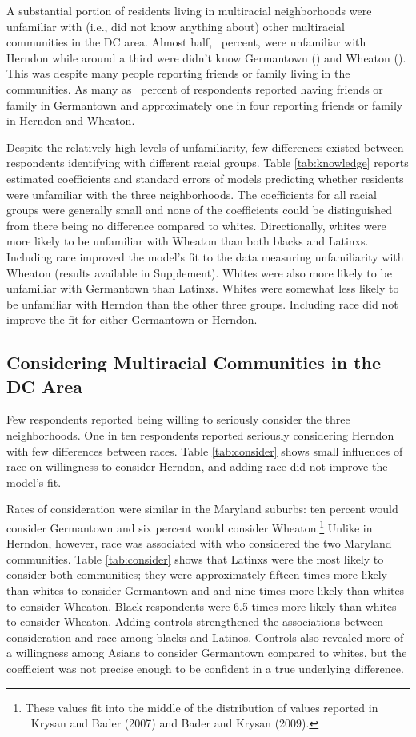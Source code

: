 \documentclass{baderart}
\newcommand{\TK}{\strong{TK}}
\begin{document}
A substantial portion of residents living in multiracial neighborhoods were unfamiliar with (i.e., did not know anything about) other multiracial communities in the DC area. Almost half, \dkherndon~percent, were unfamiliar with Herndon while around a third were didn't know Germantown (\dkgermantown) and Wheaton (\dkwheaton). This was despite many people reporting friends or family living in the communities. As many as \ffgermantown~percent of respondents reported having friends or family in Germantown and approximately one in four reporting friends or family in Herndon and Wheaton.

Despite the relatively high levels of unfamiliarity, few differences existed between respondents identifying with different racial groups. Table \ref{tab:knowledge} reports estimated coefficients and standard errors of models predicting whether residents were unfamiliar with the three neighborhoods. The coefficients for all racial groups were generally small and none of the coefficients could be distinguished from there being no difference compared to whites. Directionally, whites were more likely to be unfamiliar with Wheaton than both blacks and Latinxs. Including race improved the model's fit to the data measuring unfamiliarity with Wheaton (results available in Supplement). Whites were also more likely to be unfamiliar with Germantown than Latinxs. Whites were somewhat less likely to be unfamiliar with Herndon than the other three groups. Including race did not improve the fit for either Germantown or Herndon. 


\subsection{Considering Multiracial Communities in the DC Area}
Few respondents reported being willing to seriously consider the three neighborhoods. One in ten respondents reported seriously considering Herndon with few differences between races. Table \ref{tab:consider} shows small influences of race on willingness to consider Herndon, and adding race did not improve the model's fit. 


Rates of consideration were similar in the Maryland suburbs: ten percent would consider Germantown and six percent would consider Wheaton.\footnote{These values fit into the middle of the distribution of values reported in \TK\ Krysan and Bader (2007) and Bader and Krysan (2009).} Unlike in Herndon, however, race was associated with who considered the two Maryland communities. Table \ref{tab:consider} shows that Latinxs were the most likely to consider both communities; they were approximately fifteen times more likely than whites to consider Germantown and and nine times more likely than whites to consider Wheaton. Black respondents were 6.5 times more likely than whites to consider Wheaton. Adding controls strengthened the associations between consideration and race among blacks and Latinos. Controls also revealed more of a willingness among Asians to consider Germantown compared to whites, but the coefficient was not precise enough to be confident in a true underlying difference. 
\end{document}
